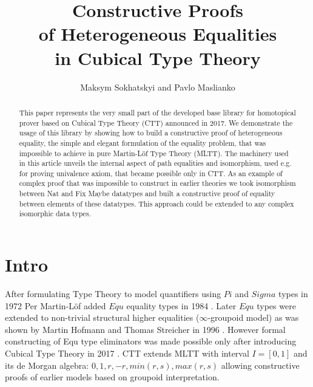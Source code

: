 \documentclass{svproc}
\begin{document}
\title{Constructive Proofs \\
       of Heterogeneous Equalities \\
       in Cubical Type Theory}
\author{Maksym Sokhatskyi and Pavlo Maslianko}

\maketitle

\begin{abstract}
This paper represents the very small part of the developed base library for homotopical
prover based on Cubical Type Theory (CTT) announced in 2017. We demonstrate the usage
of this library by showing how to build a constructive proof of heterogeneous equality,
the simple and elegant formulation of the equality problem, that was impossible to achieve
in pure Martin-Löf Type Theory (MLTT). The machinery used in this article unveils
the internal aspect of path equalities and isomorphism, used e.g. for proving univalence
axiom, that became possible only in CTT. As an example of complex proof that was
impossible to construct in earlier theories we took isomorphism between Nat and Fix Maybe
datatypes and built a constructive proof of equality between elements of these datatypes.
This approach could be extended to any complex isomorphic data types.
\end{abstract}


\section{Intro}

After formulating Type Theory to model quantifiers using $Pi$ and $Sigma$ types in 1972 \cite{Lof72}
Per Martin-Löf added $Equ$ equality types in 1984 \cite{Lof84}. Later $Equ$ types were extended
to non-trivial structural higher equalities ($\infty$-groupoid model) as was shown by Martin Hofmann
and Thomas Streicher in 1996 \cite{Hofmann96}. However formal constructing of Equ type
eliminators was made possible only after introducing Cubical Type Theory in 2017 \cite{Mortberg17}.
CTT extends MLTT with interval $I=[0,1]$ and its de Morgan algebra: $0, 1, r, -r, min(r,s), max(r,s)$
allowing constructive proofs of earlier models based on groupoid interpretation.
\end{document}
